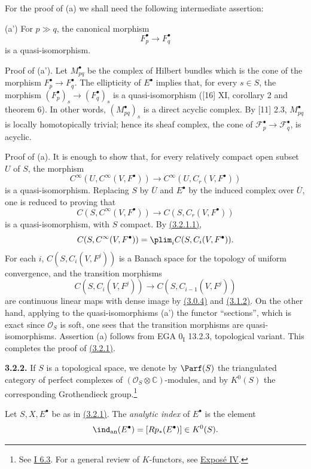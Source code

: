 For the proof of (a) we shall need the following intermediate assertion:

(a') For $p\gg q$, the canonical morphism
\[
 F_p^\bullet\longrightarrow F_q^\bullet
\]
is a quasi-isomorphism.

Proof of (a'). Let $M_{pq}^\bullet$ be the complex of Hilbert bundles which is the cone of the morphism $F_p^\bullet\to F_q^\bullet$. The ellipticity of $E^\bullet$ implies that, for every $s\in S$, the morphism $(F_p^\bullet)_s\to(F_q^\bullet)_s$ is a quasi-isomorphism ([16] XI, corollary 2 and theorem 6). In other words, $(M_{pq}^\bullet)_s$ is a direct acyclic complex. By [11] 2.3, $M_{pq}^\bullet$ is locally homotopically trivial; hence its sheaf complex, the cone of $\mathcal F_p^\bullet\to\mathcal F_q^\bullet$, is acyclic.

Proof of (a). It is enough to show that, for every relatively compact open subset $U$ of $S$, the morphism
\[
 C^\infty(U,C^\infty(V,F^\bullet))\longrightarrow C^\infty(U,C_r(V,F^\bullet))
\]
is a quasi-isomorphism. Replacing $S$ by $\overline U$ and $E^\bullet$ by the induced complex over $\overline U$, one is reduced to proving that
\[
 C(S,C^\infty(V,F^\bullet))\longrightarrow C(S,C_r(V,F^\bullet))
\]
is a quasi-isomorphism, with $S$ compact. By \hyperlink{sga6.e02.eq.3-2-1-1}{(3.2.1.1)},
\[
 C(S,C^\infty(V,F^\bullet))=\plim_i C(S,C_i(V,F^\bullet)).
\]
For each $i$, $C(S,C_i(V,F^j))$ is a Banach space for the topology of uniform convergence, and the transition morphisms
\[
 C(S,C_i(V,F^j))\longrightarrow C(S,C_{i-1}(V,F^j))
\]
are continuous linear maps with dense image by \hyperlink{sga6.e02.para.3-0-4}{(3.0.4)} and \hyperlink{sga6.e02.lem.3-1-2}{(3.1.2)}. On the other hand, applying to the quasi-isomorphisms (a') the functor ``sections'', which is exact since $\mathcal O_S$ is soft, one sees that the transition morphisms are quasi-isomorphisms. Assertion (a) follows from EGA $0_{\mathrm I}$ 13.2.3, topological variant. This completes the proof of \hyperlink{sga6.e02.thm.3-2-1}{(3.2.1)}.

\textbf{3.2.2.} If $S$ is a topological space, we denote by $\Parf(S)$ the triangulated category of perfect complexes of $(\mathcal O_S\otimes\mathbb C)$-modules, and by $K^0(S)$ the corresponding Grothendieck group.\footnote{See \hyperlink{sga6.e01.para.6-3}{I 6.3}. For a general review of $K$-functors, see \hyperlink{sga6.e04.expose}{Exposé IV}.}

Let $S,X,E^\bullet$ be as in \hyperlink{sga6.e02.thm.3-2-1}{(3.2.1)}. The \emph{analytic index} of $E^\bullet$ is the element
\[
 \ind_{\mathrm{an}}(E^\bullet)=[Rp_*(E^\bullet)]\in K^0(S).
\]

